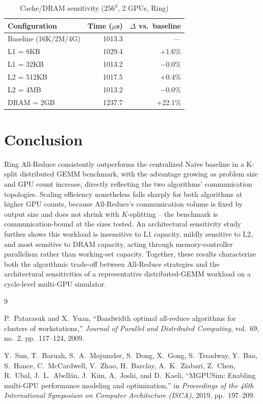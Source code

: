 \documentclass[conference]{IEEEtran}
\begin{document}
\begin{table}[htbp]
\caption{Cache/DRAM sensitivity ($256^3$, 2 GPUs, Ring)}
\label{tab:cache}
\centering
\footnotesize
\begin{tabular}{@{}lrr@{}}
\toprule
Configuration & Time ($\mu$s) & $\Delta$ vs.\ baseline \\
\midrule
Baseline (16K/2M/4G) & 1013.3 & --- \\
L1 = 8KB  & 1029.4 & +1.6\% \\
L1 = 32KB & 1013.2 & $-$0.0\% \\
L2 = 512KB & 1017.5 & +0.4\% \\
L2 = 4MB  & 1013.2 & $-$0.0\% \\
DRAM = 2GB & 1237.7 & +22.1\% \\
\bottomrule
\end{tabular}
\end{table}

\section{Conclusion}
\label{sec:conclusion}

Ring All-Reduce consistently outperforms the centralized Naive baseline in a K-split distributed GEMM benchmark, with the advantage growing as problem size and GPU count increase, directly reflecting the two algorithms' communication topologies. Scaling efficiency nonetheless falls sharply for both algorithms at higher GPU counts, because All-Reduce's communication volume is fixed by output size and does not shrink with $K$-splitting -- the benchmark is communication-bound at the sizes tested. An architectural sensitivity study further shows this workload is insensitive to L1 capacity, mildly sensitive to L2, and most sensitive to DRAM capacity, acting through memory-controller parallelism rather than working-set capacity. Together, these results characterize both the algorithmic trade-off between All-Reduce strategies and the architectural sensitivities of a representative distributed-GEMM workload on a cycle-level multi-GPU simulator.

\begin{thebibliography}{9}

P.~Patarasuk and X.~Yuan, ``Bandwidth optimal all-reduce algorithms for clusters of workstations,'' \emph{Journal of Parallel and Distributed Computing}, vol.~69, no.~2, pp.~117--124, 2009.

Y.~Sun, T.~Baruah, S.~A.~Mojumder, S.~Dong, X.~Gong, S.~Treadway, Y.~Bao, S.~Hance, C.~McCardwell, V.~Zhao, H.~Barclay, A.~K.~Ziabari, Z.~Chen, R.~Ubal, J.~L.~Abell\'{a}n, J.~Kim, A.~Joshi, and D.~Kaeli, ``MGPUSim: Enabling multi-GPU performance modeling and optimization,'' in \emph{Proceedings of the 46th International Symposium on Computer Architecture (ISCA)}, 2019, pp.~197--209.

\end{thebibliography}
\end{document}
